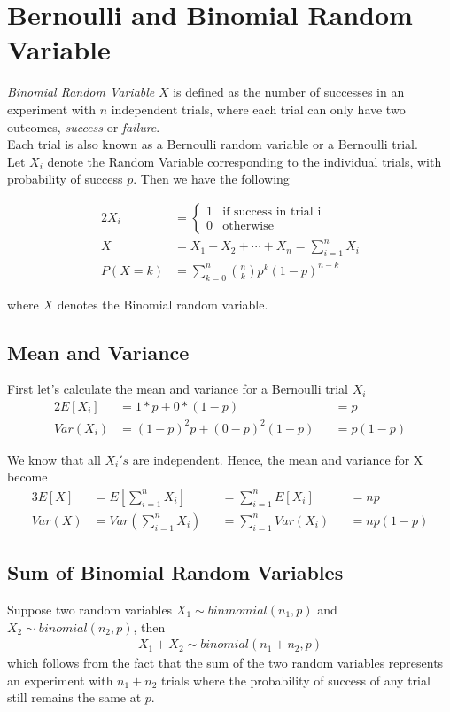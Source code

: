 \documentclass[../../probability-notes.tex]{subfiles}
\begin{document}
    \section{Bernoulli and Binomial Random Variable}
    \emph{Binomial Random Variable} $X$ is defined as the number of successes in an experiment with $n$ independent trials, where each trial can only have two outcomes, \emph{success} or \emph{failure}.\\
    Each trial is also known as a Bernoulli random variable or a Bernoulli trial.\\
    Let $X_{i}$ denote the Random Variable corresponding to the individual trials, with probability of success $p$. Then we have the following

    \begin{alignat*}{2}
        X_{i} &= \begin{cases} 1 &\mbox{if success in trial i}\\
                                0 &\mbox{otherwise} \end{cases} \tag*{indicator variable} \\
        X &= X_{1} + X_{2} + \cdots + X_{n} = \sum_{i=1}^{n} X_{i} \\
        P(X=k) &= \sum_{k=0}^{n} \binom{n}{k} p^{k} (1 - p)^{n-k}
    \end{alignat*}

    where $X$ denotes the Binomial random variable.

    \subsection{Mean and Variance}
    First let's calculate the mean and variance for a Bernoulli trial $X_{i}$
    \begin{alignat*}{2}
        E[X_{i}] &= 1 * p + 0 * (1 - p) &&= p\\
        Var(X_{i}) &= (1 - p)^{2}p + (0-p)^{2}(1-p) &&= p(1-p)
    \end{alignat*}

    We know that all $X_{i}'s$ are independent. Hence, the mean and variance for X become
    \begin{alignat*}{3}
        E[X] &= E[\sum_{i=1}^{n} X_{i}] &&= \sum_{i=1}^{n}E[X_{i}] &&= np \\
        Var(X) &= Var(\sum_{i=1}^{n} X_{i}) &&= \sum_{i=1}^{n} Var(X_{i}) &&= np(1-p)
    \end{alignat*}

    \subsection{Sum of Binomial Random Variables}
    Suppose two random variables $X_{1} \sim binmomial(n_{1},p)$ and $X_{2} \sim binomial(n_{2},p)$, then
    \begin{align*}
        X_{1} + X_{2} \sim binomial(n_{1} + n_{2}, p)
    \end{align*}
    which follows from the fact that the sum of the two random variables represents an experiment with $n_{1} + n_{2}$ trials where the probability of success of any trial still remains the same at $p$.
\end{document}
